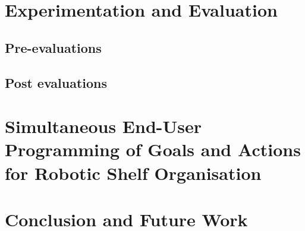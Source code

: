 \documentclass[a4paper,12pt,twoside,openany]{book}
\theoremstyle{definition}
\theoremstyle{remark}
\begin{document}
\chapter{Experimentation and Evaluation}\label{chap:Evaluation}
\minitoc%
\section{Pre-evaluations}

\section{Post evaluations}




\chapter{Simultaneous End-User Programming of Goals and Actions for Robotic Shelf Organisation}\label{chap:OrganisingTasks}
\minitoc%



\chapter{Conclusion and Future Work}\label{chap:Conclusion}
\minitoc%



\clearpage



%
\end{document}
